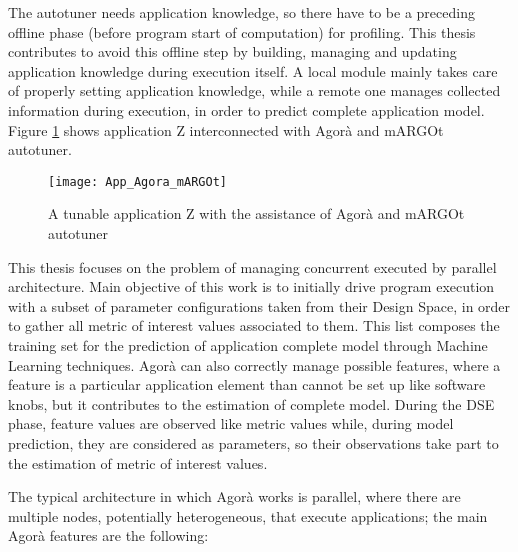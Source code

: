 The autotuner needs application knowledge, so there have to be a preceding offline phase (before program start of computation) for profiling. This thesis contributes to avoid this offline step by building, managing and updating application knowledge during execution itself. A local module mainly takes care of properly setting application knowledge, while a remote one manages collected information during execution, in order to predict complete application model. Figure \ref{fig::appAGORA} shows application Z interconnected with Agorà and mARGOt autotuner.

\begin{figure}[H]

    \centering
    \texttt{[image: App\_Agora\_mARGOt]}
    \caption{A tunable application Z with the assistance of Agorà and mARGOt autotuner}
    \label{fig::appAGORA}
    
\end{figure}

This thesis focuses on the problem of managing concurrent executed by parallel architecture. Main objective of this work is to initially drive program execution with a subset of parameter configurations taken from their Design Space, in order to gather all metric of interest values associated to them. This list composes the training set for the prediction of application complete model through Machine Learning techniques. Agorà can also correctly manage possible features, where a feature is a particular application element than cannot be set up like software knobs, but it contributes to the estimation of complete model. During the DSE phase, feature values are observed like metric values while, during model prediction, they are considered as parameters, so their observations take part to the estimation of metric of interest values.

The typical architecture in which Agorà works is parallel, where there are multiple nodes, potentially heterogeneous, that execute applications; the main Agorà features are the following:

